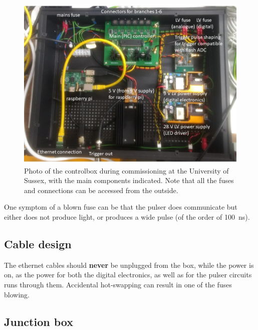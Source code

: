 \begin{figure}
\begin{center}	
  \includegraphics[width=0.75\linewidth]{figures/controlbox.jpg}
  \caption{Photo of the controlbox during commissioning at the University of Sussex, with the main components indicated. Note that all the fuses and connections can be accessed from the outside.}
  \label{figure:controlbox}
\end{center}
\end{figure}

One symptom of a blown fuse can be that  the pulser does communicate but either does not produce light, or produces a wide pulse (of the order of 100~ns).


\subsection*{Cable design}

The ethernet cables should {\bf never} be unplugged from the box, while the power is on, as the power for both the digital electronics, as well as for the pulser circuits runs through them. Accidental hot-swapping can result in one of the fuses blowing. 


\subsection*{Junction box}

